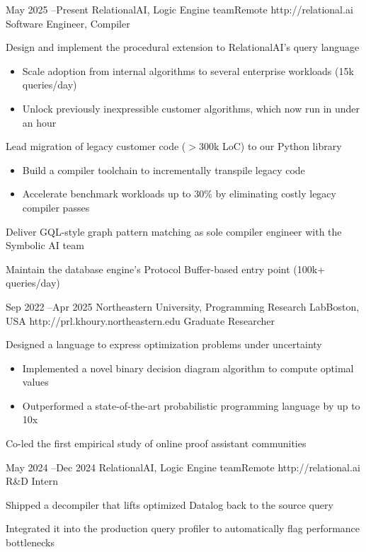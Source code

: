\documentclass[11pt]{article} %
\begin{document}
\job
{May 2025 --}{Present}
{RelationalAI, Logic Engine team}{Remote}
{http://relational.ai}
{Software Engineer, Compiler}
{
    \item Design and implement the procedural extension to RelationalAI's query language
    \begin{itemize}
        \item Scale adoption from internal algorithms to several enterprise workloads (15k queries/day)
        \item Unlock previously inexpressible customer algorithms, which now run in under an hour
    \end{itemize}
    \item Lead migration of legacy customer code ($>$300k LoC) to our Python library
    \begin{itemize}
        \item Build a compiler toolchain to incrementally transpile legacy code
        \item Accelerate benchmark workloads up to 30\% by eliminating costly legacy compiler passes
    \end{itemize}
    \item Deliver GQL-style graph pattern matching as sole compiler engineer with the Symbolic AI team
    \item Maintain the database engine's Protocol Buffer-based entry point (100k+ queries/day)
}

\job
{Sep 2022 --}{Apr 2025}
{Northeastern University, Programming Research Lab}{Boston, USA}
{http://prl.khoury.northeastern.edu}
{Graduate Researcher}
{
    \item Designed a language to express optimization problems under uncertainty~\cite{cho2025}
    \begin{itemize}
        \item Implemented a novel binary decision diagram algorithm to compute optimal values
        \item Outperformed a state-of-the-art probabilistic programming language by up to 10x
    \end{itemize}
    \item Co-led the first empirical study of online proof assistant communities~\cite{lincroft2024}
}

\job
{May 2024 --}{Dec 2024}
{RelationalAI, Logic Engine team}{Remote}
{http://relational.ai}
{R\&D Intern}
{
    \item Shipped a decompiler that lifts optimized Datalog back to the source query
    \item Integrated it into the production query profiler to automatically flag performance bottlenecks
}
\end{document}
